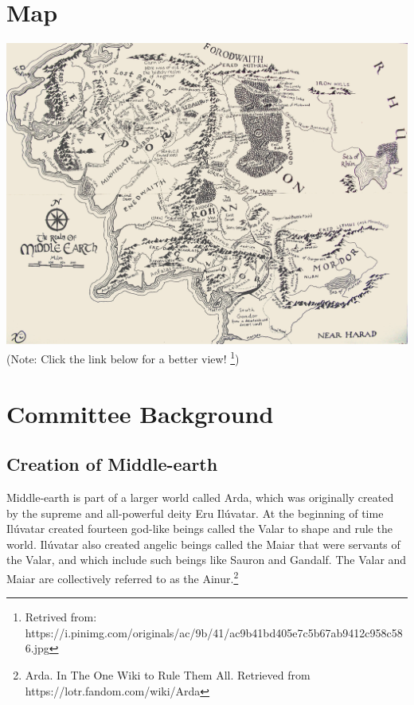 \documentclass[10pt, letterpaper]{article}
\begin{document}
            \section{Map}
            \begin{center}
             \includegraphics[scale = 0.25]{image7.png}\\
             (Note: Click the link below for a better view! \footnote{Retrived from: https://i.pinimg.com/originals/ac/9b/41/ac9b41bd405e7c5b67ab9412c958c586.jpg})
            \end{center}
            
            \newpage
            \section{Committee Background}
            
            \subsection{Creation of Middle-earth}
            
    \noindent Middle-earth is part of a larger world called Arda, which was originally created by the supreme and all-powerful deity Eru Ilúvatar. At the beginning of time Ilúvatar created fourteen god-like beings called the Valar to shape and rule the world. Ilúvatar also created angelic beings called the Maiar that were servants of the Valar, and which include such beings like Sauron and Gandalf. The Valar and Maiar are collectively referred to as the Ainur.\footnote{Arda. In The One Wiki to Rule Them All. Retrieved from https://lotr.fandom.com/wiki/Arda } \\
    
\end{document}
